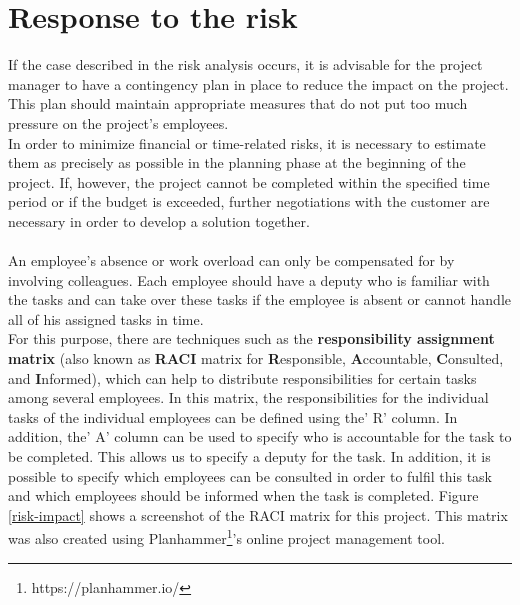 \section{Response to the risk}
If the case described in the risk analysis occurs, it is advisable for the project manager to have a contingency plan in place to reduce the impact on the project. This plan should maintain appropriate measures that do not put too much pressure on the project's employees.
\\
In order to minimize financial or time-related risks, it is necessary to estimate them as precisely as possible in the planning phase at the beginning of the project. If, however, the project cannot be completed within the specified time period or if the budget is exceeded, further negotiations with the customer are necessary in order to develop a solution together.
\\\\
An employee's absence or work overload can only be compensated for by involving colleagues. Each employee should have a deputy who is familiar with the tasks and can take over these tasks if the employee is absent or cannot handle all of his assigned tasks in time. 
\\
For this purpose, there are techniques such as the \textbf{responsibility assignment matrix} (also known as \textbf{RACI} matrix for \textbf{R}esponsible, \textbf{A}ccountable, \textbf{C}onsulted, and \textbf{I}nformed), which can help to distribute responsibilities for certain tasks among several employees. In this matrix, the responsibilities for the individual tasks of the individual employees can be defined using the' R' column. In addition, the' A' column can be used to specify who is accountable for the task to be completed. This allows us to specify a deputy for the task. In addition, it is possible to specify which employees can be consulted in order to fulfil this task and which employees should be informed when the task is completed. Figure \ref{risk-impact} shows a screenshot of the RACI matrix for this project. This matrix was also created using Planhammer\footnote{https://planhammer.io/}'s online project management tool.
